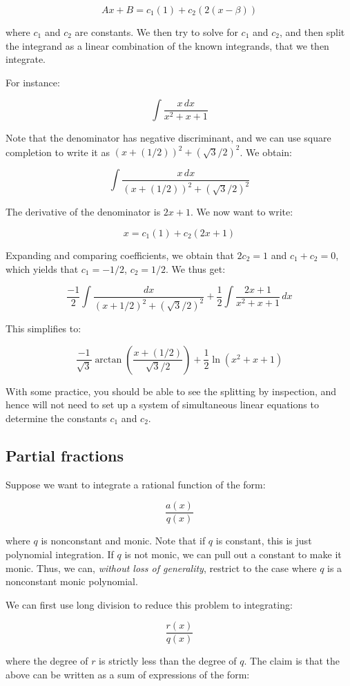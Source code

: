 \documentclass[10pt]{amsart}
\begin{document}
$$Ax + B = c_1(1) + c_2(2(x - \beta))$$

where $c_1$ and $c_2$ are constants. We then try to solve for $c_1$
and $c_2$, and then split the integrand as a linear combination of the
known integrands, that we then integrate.

For instance:

$$\int \frac{x \, dx}{x^2 + x + 1}$$

Note that the denominator has negative discriminant, and we can use
square completion to write it as $(x + (1/2))^2 + (\sqrt{3}/2)^2$. We obtain:

$$\int \frac{x \, dx}{(x + (1/2))^2 + (\sqrt{3}/2)^2} $$

The derivative of the denominator is $2x + 1$. We now want to write:

$$x = c_1(1) + c_2(2x + 1)$$

Expanding and comparing coefficients, we obtain that $2c_2 = 1$ and
$c_1 + c_2 = 0$, which yields that $c_1 = -1/2$, $c_2 = 1/2$. We thus get:

$$\frac{-1}{2} \int \frac{dx}{(x + 1/2)^2 + (\sqrt{3}/2)^2}  + \frac{1}{2} \int \frac{2x + 1}{x^2 + x + 1} \, dx$$

This simplifies to:

$$\frac{-1}{\sqrt{3}} \arctan\left(\frac{x + (1/2)}{\sqrt{3}/2}\right) + \frac{1}{2} \ln(x^2 + x + 1)$$

With some practice, you should be able to see the splitting by
inspection, and hence will not need to set up a system of simultaneous
linear equations to determine the constants $c_1$ and $c_2$.

\subsection{Partial fractions}

Suppose we want to integrate a rational function of the form:

$$\frac{a(x)}{q(x)}$$

where $q$ is nonconstant and monic. Note that if $q$ is constant, this
is just polynomial integration. If $q$ is not monic, we can pull out a
constant to make it monic. Thus, we can, {\em without loss of
generality}, restrict to the case where $q$ is a nonconstant monic
polynomial.

We can first use long division to reduce this problem to integrating:

$$\frac{r(x)}{q(x)}$$

where the degree of $r$ is strictly less than the degree of $q$. The
claim is that the above can be written as a sum of expressions of
the form:
\end{document}
